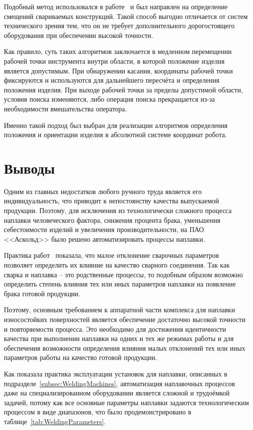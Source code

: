Подобный метод использовался в работе~\cite{Fei_Gao_2015} и был направлен на определение смещений свариваемых конструкций.
Такой способ выгодно отличается от систем технического зрения тем, что он не требует дополнительного дорогостоящего оборудования при обеспечении высокой точности.

Как правило, суть таких алгоритмов заключается в медленном перемещении рабочей точки инструмента внутри области, в которой положение изделия является допустимым.
При обнаружении касания, координаты рабочей точки фиксируются и используются для дальнейшего пересчёта и определения положения изделия.
При выходе рабочей точки за пределы допустимой области, условия поиска изменяются, либо операция поиска прекращается из-за необходимости вмешательства оператора.

Именно такой подход был выбран для реализации алгоритмов определения положения и ориентации изделия в абсолютной системе координат робота.


\section{Выводы}
Одним из главных недостатков любого ручного труда является его индивидуальность, что приводит к непостоянству качества выпускаемой продукции.
Поэтому, для исключения из технологически сложного процесса наплавки человеческого фактора, снижения процента брака, уменьшения себестоимости изделий и увеличения производительности, на ПАО <<Аскольд>> было решено автоматизировать процессы наплавки.

Практика работ~\cite{Al_Sarraf_2016, Dai_2011, Gwan_Hyung_Kim, Liang_2011, Lin_2018, Xu_2008} показала, что малое отклонение сварочных параметров позволяет определить их влияние на качество сварного соединения.
Так как сварка и наплавка -- это родственные процессы, то подобным образом возможно определить степень влияния тех или иных параметров наплавки на появление брака готовой продукции.

Поэтому, основным требованием к аппаратной части комплекса для наплавки износостойких поверхностей является обеспечение достаточно высокой точности и повторяемости процесса.
Это необходимо для достижения идентичности качества при выполнении наплавки на одних и тех же режимах работы и для обеспечения возможности определения влияния малых отклонений тех или иных параметров работы на качество готовой продукции.

Как показала практика эксплуатации установок для наплавки, описанных в подразделе~\ref{subsec:WeldingMachines}, автоматизация наплавочных процессов даже на специализированном оборудовании является сложной и трудоёмкой задачей, потому как все основные параметры наплавки задаются технологическим процессом в виде диапазонов, что было продемонстрировано в таблице~\ref{tab:WeldingParameters}.

